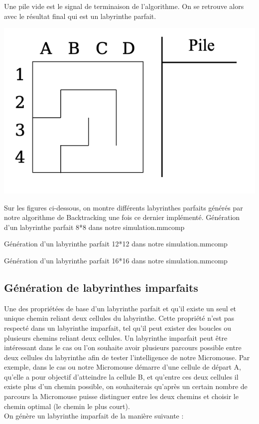 \begin{minipage}{0.6\textwidth}
Une pile vide est le signal de terminaison de l'algorithme. On se retrouve alors avec le résultat final qui est un labyrinthe parfait.
\\

\end{minipage}
\begin{minipage}{0.42\textwidth}
\includegraphics[width=\linewidth]{report/pics/backtracking8.png}
\end{minipage}

Sur les figures ci-dessous, on montre différents labyrinthes parfaits générés par notre algorithme de Backtracking une fois ce dernier implémenté.
{Génération d'un labyrinthe parfait 8*8 dans notre simulation.}{mmcomp}
\newpage

{Génération d'un labyrinthe parfait 12*12 dans notre simulation.}{mmcomp}

{Génération d'un labyrinthe parfait 16*16 dans notre simulation.}{mmcomp}

\subsection{Génération de labyrinthes imparfaits}
Une des propriétées de base d'un labyrinthe parfait et qu'il existe un seul et unique chemin reliant deux cellules du labyrinthe. Cette propriété n'est pas respecté dans un labyrinthe imparfait, tel qu'il peut exister des boucles ou plusieurs chemins reliant deux cellules. Un labyrinthe imparfait peut être intéressant dans le cas ou l'on souhaite avoir plusieurs parcours possible entre deux cellules du labyrinthe afin de tester l'intelligence de notre Micromouse. Par exemple, dans le cas ou notre Micromouse démarre d'une cellule de départ A, qu'elle a pour objectif d'atteindre la cellule B, et qu'entre ces deux cellules il existe plus d'un chemin possible, on souhaiterais qu'après un certain nombre de parcours la Micromouse puisse distinguer entre les deux chemins et choisir le chemin optimal (le chemin le plus court).
\\
\newline
On génère un labyrinthe imparfait de la manière suivante :

